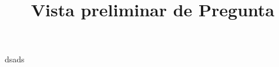 \documentclass[a4paper,10pt]{article}\usepackage[utf8]{inputenc}\usepackage[spanish]{babel}\usepackage{times}
\title{Vista preliminar de Pregunta}
\begin{document}
\twocolumn 

\maketitle

dsads
\end{document}

